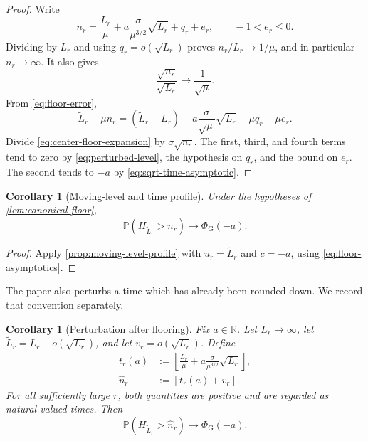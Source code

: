 \documentclass[10pt,reqno,a4paper]{amsart}
\numberwithin{equation}{section}
\theoremstyle{plain}
\newtheorem{corollary}[theorem]{Corollary}
\theoremstyle{definition}
\theoremstyle{remark}
\newcommand{\R}{\mathbb{R}}
\newcommand{\Pp}{\mathbb{P}}
\newcommand{\1}{\mathbf{1}}
\begin{document}
\begin{proof}
  Write
  \begin{equation}\label{eq:floor-error}
    n_r
    =
    \frac{L_r}{\mu}
    +a\frac{\sigma}{\mu^{3/2}}\sqrt{L_r}
    +q_r+e_r,
    \qquad -1<e_r\leq0.
  \end{equation}
  Dividing by $L_r$ and using $q_r=o(\sqrt{L_r})$ proves
  $n_r/L_r\to1/\mu$, and in particular $n_r\to\infty$.  It also gives
  \begin{equation}\label{eq:sqrt-time-asymptotic}
    \frac{\sqrt{n_r}}{\sqrt{L_r}}
    \longrightarrow\frac1{\sqrt\mu}.
  \end{equation}
  From \cref{eq:floor-error},
  \begin{equation}\label{eq:center-floor-expansion}
    \widetilde L_r-\mu n_r
    =
    (\widetilde L_r-L_r)
    -a\frac{\sigma}{\sqrt\mu}\sqrt{L_r}
    -\mu q_r-\mu e_r.
  \end{equation}
  Divide \cref{eq:center-floor-expansion} by
  $\sigma\sqrt{n_r}$.  The first, third, and fourth terms tend to zero by
  \cref{eq:perturbed-level}, the hypothesis on $q_r$, and the bound on
  $e_r$.  The second tends to $-a$ by
  \cref{eq:sqrt-time-asymptotic}.
\end{proof}

\begin{corollary}[Moving-level and time profile]
\label{cor:moving-level-time-profile}
  Under the hypotheses of \cref{lem:canonical-floor},
  \begin{equation}\label{eq:moving-level-time-profile}
    \Pp(H_{\widetilde L_r}>n_r)
    \longrightarrow
    \Phi_{\mathrm G}(-a).
  \end{equation}
\end{corollary}

\begin{proof}
  Apply \cref{prop:moving-level-profile} with $u_r=\widetilde L_r$ and
  $c=-a$, using \cref{eq:floor-asymptotics}.
\end{proof}

The paper also perturbs a time which has already been rounded down.  We record
that convention separately.

\begin{corollary}[Perturbation after flooring]
\label{cor:post-floor-profile}
  Fix $a\in\R$.  Let $L_r\to\infty$, let
  $\widetilde L_r=L_r+o(\sqrt{L_r})$, and let
  $v_r=o(\sqrt{L_r})$.  Define
  \begin{align}
    t_r(a)
    &:=
    \left\lfloor
      \frac{L_r}{\mu}
      +a\frac{\sigma}{\mu^{3/2}}\sqrt{L_r}
    \right\rfloor,\label{eq:base-floored-time}\\
    \widehat n_r
    &:=\left\lfloor t_r(a)+v_r\right\rfloor.
    \label{eq:post-floor-time}
  \end{align}
  For all sufficiently large $r$, both quantities are positive and are
  regarded as natural-valued times.  Then
  \begin{equation}\label{eq:post-floor-profile}
    \Pp(H_{\widetilde L_r}>\widehat n_r)
    \longrightarrow
    \Phi_{\mathrm G}(-a).
  \end{equation}
\end{corollary}
\end{document}
